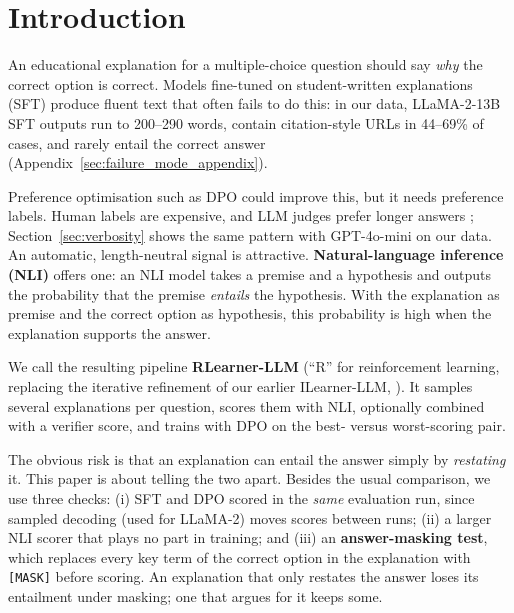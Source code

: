 \section{Introduction}

An educational explanation for a multiple-choice question should say \emph{why} the correct option is correct. Models fine-tuned on student-written explanations (SFT) produce fluent text that often fails to do this: in our data, LLaMA-2-13B SFT outputs run to 200--290 words, contain citation-style URLs in 44--69\% of cases, and rarely entail the correct answer (Appendix~\ref{sec:failure_mode_appendix}).

Preference optimisation such as DPO \citep{rafailov2023direct} could improve this, but it needs preference labels. Human labels are expensive, and LLM judges prefer longer answers \citep{zheng2024judging,wang2023large}; Section~\ref{sec:verbosity} shows the same pattern with GPT-4o-mini on our data. An automatic, length-neutral signal is attractive. \textbf{Natural-language inference (NLI)} offers one: an NLI model takes a premise and a hypothesis and outputs the probability that the premise \emph{entails} the hypothesis. With the explanation as premise and the correct option as hypothesis, this probability is high when the explanation supports the answer.

We call the resulting pipeline \textbf{RLearner-LLM} (``R'' for reinforcement learning, replacing the iterative refinement of our earlier ILearner-LLM, \citealp{bao2025exploring}). It samples several explanations per question, scores them with NLI, optionally combined with a verifier score, and trains with DPO on the best- versus worst-scoring pair.

The obvious risk is that an explanation can entail the answer simply by \emph{restating} it. This paper is about telling the two apart. Besides the usual comparison, we use three checks: (i) SFT and DPO scored in the \emph{same} evaluation run, since sampled decoding (used for LLaMA-2) moves scores between runs; (ii) a larger NLI scorer that plays no part in training; and (iii) an \textbf{answer-masking test}, which replaces every key term of the correct option in the explanation with \texttt{[MASK]} before scoring. An explanation that only restates the answer loses its entailment under masking; one that argues for it keeps some.




